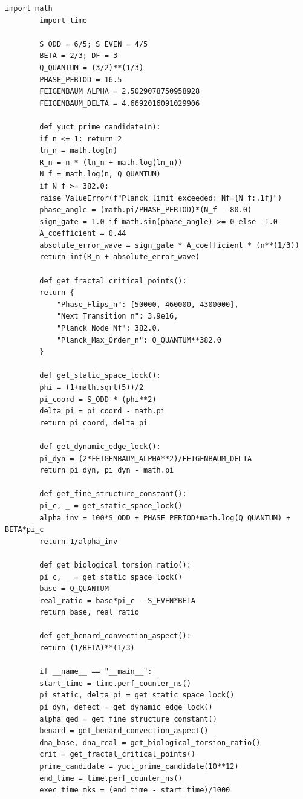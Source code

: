 \documentclass[12pt,a4paper]{article}
\begin{document}
	\begin{lstlisting}[caption={Complete YUCT coordination engine v4.0 (\texttt{yuct\_constants.py}).}, label={lst:yuct-engine}]
		import math
		import time
		
		S_ODD = 6/5; S_EVEN = 4/5
		BETA = 2/3; DF = 3
		Q_QUANTUM = (3/2)**(1/3)
		PHASE_PERIOD = 16.5
		FEIGENBAUM_ALPHA = 2.5029078750958928
		FEIGENBAUM_DELTA = 4.6692016091029906
		
		def yuct_prime_candidate(n):
		if n <= 1: return 2
		ln_n = math.log(n)
		R_n = n * (ln_n + math.log(ln_n))
		N_f = math.log(n, Q_QUANTUM)
		if N_f >= 382.0:
		raise ValueError(f"Planck limit exceeded: Nf={N_f:.1f}")
		phase_angle = (math.pi/PHASE_PERIOD)*(N_f - 80.0)
		sign_gate = 1.0 if math.sin(phase_angle) >= 0 else -1.0
		A_coefficient = 0.44
		absolute_error_wave = sign_gate * A_coefficient * (n**(1/3))
		return int(R_n + absolute_error_wave)
		
		def get_fractal_critical_points():
		return {
			"Phase_Flips_n": [50000, 460000, 4300000],
			"Next_Transition_n": 3.9e16,
			"Planck_Node_Nf": 382.0,
			"Planck_Max_Order_n": Q_QUANTUM**382.0
		}
		
		def get_static_space_lock():
		phi = (1+math.sqrt(5))/2
		pi_coord = S_ODD * (phi**2)
		delta_pi = pi_coord - math.pi
		return pi_coord, delta_pi
		
		def get_dynamic_edge_lock():
		pi_dyn = (2*FEIGENBAUM_ALPHA**2)/FEIGENBAUM_DELTA
		return pi_dyn, pi_dyn - math.pi
		
		def get_fine_structure_constant():
		pi_c, _ = get_static_space_lock()
		alpha_inv = 100*S_ODD + PHASE_PERIOD*math.log(Q_QUANTUM) + BETA*pi_c
		return 1/alpha_inv
		
		def get_biological_torsion_ratio():
		pi_c, _ = get_static_space_lock()
		base = Q_QUANTUM
		real_ratio = base*pi_c - S_EVEN*BETA
		return base, real_ratio
		
		def get_benard_convection_aspect():
		return (1/BETA)**(1/3)
		
		if __name__ == "__main__":
		start_time = time.perf_counter_ns()
		pi_static, delta_pi = get_static_space_lock()
		pi_dyn, defect = get_dynamic_edge_lock()
		alpha_qed = get_fine_structure_constant()
		benard = get_benard_convection_aspect()
		dna_base, dna_real = get_biological_torsion_ratio()
		crit = get_fractal_critical_points()
		prime_candidate = yuct_prime_candidate(10**12)
		end_time = time.perf_counter_ns()
		exec_time_mks = (end_time - start_time)/1000
		

\end{lstlisting}
\end{document}
